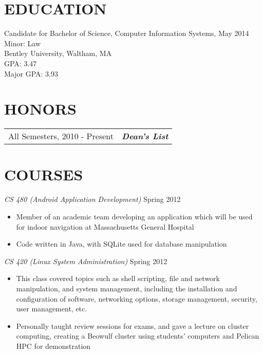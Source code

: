 \documentclass[line, margin]{res}
\begin{document}
\address{6 Cobblers Lane\\ North Reading, MA\\ (978) 505-5359\\ hentschel.nicholas@gmail.com}
\begin{resume}

\section{EDUCATION} 
  Candidate for Bachelor of Science, Computer Information Systems, May 2014 \\
  Minor: Law \\
  Bentley University, Waltham, MA \\
  GPA: 3.47 \\
  Major GPA: 3.93

\section{HONORS}
\begin{tabular}{@{}l l}
All Semesters, 2010 - Present & \textbf{\textit{Dean's List}} \\ [5pt]
\end{tabular}

\section{COURSES}
\textit{CS 480 (Android Application Development)} \hfill Spring 2012
\begin{itemize}
    \item Member of an academic team developing an application which will be used for indoor navigation at Massachusetts General Hospital
    \item Code written in Java, with SQLite used for database manipulation
\end{itemize}
\textit{CS 420 (Linux System Administration)} \hfill Spring 2012
\begin{itemize}
    \item This class covered topics such as shell scripting, file and network manipulation, and system management, including the installation and configuration of software, networking options, storage management, security, user management, etc. 
    \item Personally taught review sessions for exams, and gave a lecture on cluster computing, creating a Beowulf cluster using students' computers and Pelican HPC for demonstration
\end{itemize}


\end{resume}
\end{document}
